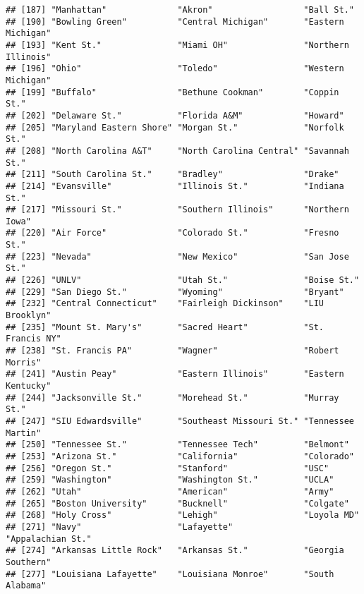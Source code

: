 \documentclass[
]{article}
\begin{document}
\begin{verbatim}
## [187] "Manhattan"              "Akron"                  "Ball St."              
## [190] "Bowling Green"          "Central Michigan"       "Eastern Michigan"      
## [193] "Kent St."               "Miami OH"               "Northern Illinois"     
## [196] "Ohio"                   "Toledo"                 "Western Michigan"      
## [199] "Buffalo"                "Bethune Cookman"        "Coppin St."            
## [202] "Delaware St."           "Florida A&M"            "Howard"                
## [205] "Maryland Eastern Shore" "Morgan St."             "Norfolk St."           
## [208] "North Carolina A&T"     "North Carolina Central" "Savannah St."          
## [211] "South Carolina St."     "Bradley"                "Drake"                 
## [214] "Evansville"             "Illinois St."           "Indiana St."           
## [217] "Missouri St."           "Southern Illinois"      "Northern Iowa"         
## [220] "Air Force"              "Colorado St."           "Fresno St."            
## [223] "Nevada"                 "New Mexico"             "San Jose St."          
## [226] "UNLV"                   "Utah St."               "Boise St."             
## [229] "San Diego St."          "Wyoming"                "Bryant"                
## [232] "Central Connecticut"    "Fairleigh Dickinson"    "LIU Brooklyn"          
## [235] "Mount St. Mary's"       "Sacred Heart"           "St. Francis NY"        
## [238] "St. Francis PA"         "Wagner"                 "Robert Morris"         
## [241] "Austin Peay"            "Eastern Illinois"       "Eastern Kentucky"      
## [244] "Jacksonville St."       "Morehead St."           "Murray St."            
## [247] "SIU Edwardsville"       "Southeast Missouri St." "Tennessee Martin"      
## [250] "Tennessee St."          "Tennessee Tech"         "Belmont"               
## [253] "Arizona St."            "California"             "Colorado"              
## [256] "Oregon St."             "Stanford"               "USC"                   
## [259] "Washington"             "Washington St."         "UCLA"                  
## [262] "Utah"                   "American"               "Army"                  
## [265] "Boston University"      "Bucknell"               "Colgate"               
## [268] "Holy Cross"             "Lehigh"                 "Loyola MD"             
## [271] "Navy"                   "Lafayette"              "Appalachian St."       
## [274] "Arkansas Little Rock"   "Arkansas St."           "Georgia Southern"      
## [277] "Louisiana Lafayette"    "Louisiana Monroe"       "South Alabama"         

\end{verbatim}
\end{document}
